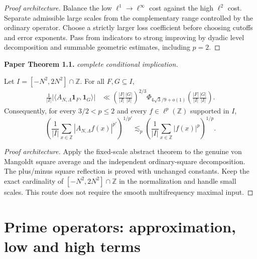 \begin{proof}[Proof architecture]
\leanok
Balance the low $\ell^1\!\to\!\ell^\infty$ cost against the high $\ell^2$ cost. Separate admissible large scales from the complementary range controlled by the ordinary operator. Choose a strictly larger loss coefficient before choosing cutoffs and error exponents. Pass from indicators to strong improving by dyadic level decomposition and summable geometric estimates, including $p=2$.
\end{proof}

\begin{theorem}
\label{prime_improving}
\leanok
\par\medskip\noindent\textbf{Paper Theorem 1.1.} \textit{complete conditional implication.}\par
Let \(I=[-N^2,2N^2]\cap\mathbb Z\).  For all \(F,G\subseteq I\),
\begin{align}
 \frac1{|I|}
 \bigl|\langle A_{N,\Lambda}\mathbf1_F,\mathbf1_G\rangle\bigr|
 &\ll
 \left(\frac{|F|}{|I|}\frac{|G|}{|I|}\right)^{2/3}
 \Phi_{4\sqrt3/9+o(1)}
 \left(\frac{|F|}{|I|}\frac{|G|}{|I|}\right).
\end{align}
Consequently, for every \(3/2<p\leq2\) and every
\(f\in\ell^p(\mathbb Z)\) supported in $I$,
\[
 \left(\frac1{|I|}\sum_{x\in\mathbb Z}
 |A_{N,\Lambda}f(x)|^{p'}\right)^{1/p'}
 \lesssim_p
 \left(\frac1{|I|}\sum_{x\in\mathbb Z}|f(x)|^p\right)^{1/p}.
\]
\end{theorem}
\begin{proof}[Proof architecture]
\leanok
Apply the fixed-scale abstract theorem to the genuine von Mangoldt square average and the independent ordinary-square decomposition. The plus/minus square reflection is proved with unchanged constants. Keep the exact cardinality of $[-N^2,2N^2]\cap\mathbb Z$ in the normalization and handle small scales. This route does not require the smooth multifrequency maximal input.
\end{proof}

\section{Prime operators: approximation, low and high terms}

